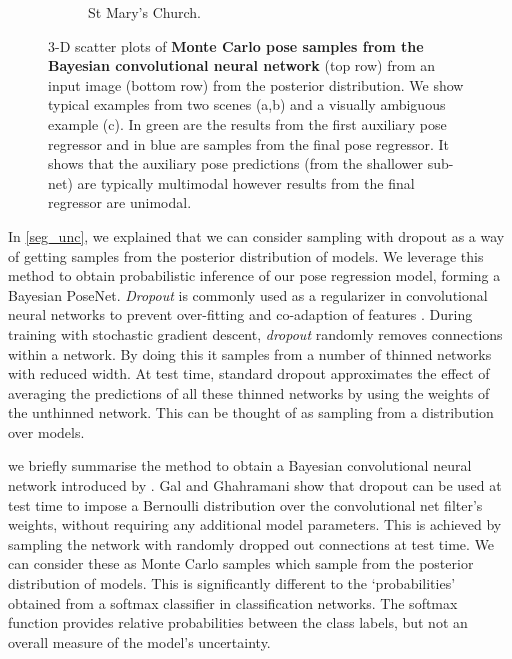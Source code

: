 \begin{figure}[t]
\begin{center}
\begin{subfigure}{0.25\linewidth}
\begin{center}
		\end{center}
        \caption{St Mary's Church.}
    \end{subfigure}
\end{center}
   \caption[Monte Carlo pose samples from the Bayesian convolutional neural network.]{3-D scatter plots of \textbf{Monte Carlo pose samples from the Bayesian convolutional neural network} (top row) from an input image (bottom row)  from the posterior distribution. We show typical examples from two scenes (a,b) and a visually ambiguous example (c). In green are the results from the first auxiliary pose regressor and in blue are samples from the final pose regressor. It shows that the auxiliary pose predictions (from the shallower sub-net) are typically multimodal however results from the final regressor are unimodal.}
\label{fig:pose_samples_3d}
\end{figure}

In \cref{seg_unc}, we explained that we can consider sampling with dropout as a way of getting samples from the posterior distribution of models. We leverage this method to obtain probabilistic inference of our pose regression model, forming a Bayesian PoseNet.
\textit{Dropout} is commonly used as a regularizer in convolutional neural networks to prevent over-fitting and co-adaption of features \citep{srivastava2014dropout}. During training with stochastic gradient descent, \textit{dropout} randomly removes connections within a network. By doing this it samples from a number of thinned networks with reduced width. At test time, standard dropout approximates the effect of averaging the predictions of all these thinned networks by using the weights of the unthinned network. This can be thought of as sampling from a distribution over models.

we briefly summarise the method to obtain a Bayesian convolutional neural network introduced by \citep{Gal2016Bayesian}. Gal and Ghahramani \citep{Gal2016Bayesian} show that dropout can be used at test time to impose a Bernoulli distribution over the convolutional net filter's weights, without requiring any additional model parameters. This is achieved by sampling the network with randomly dropped out connections at test time. We can consider these as Monte Carlo samples which sample from the posterior distribution of models.
This is significantly different to the `probabilities' obtained from a softmax classifier in classification networks. The softmax function provides relative probabilities between the class labels, but not an overall measure of the model's uncertainty.

